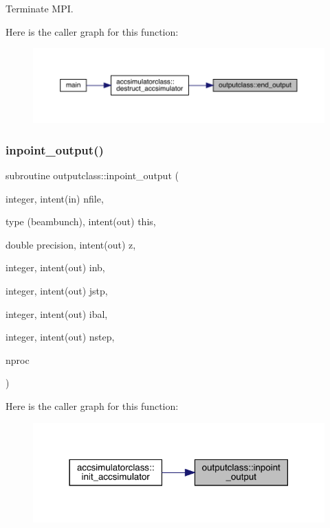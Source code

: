 Terminate M\+PI. 

Here is the caller graph for this function\+:\nopagebreak
\begin{figure}[H]
\begin{center}
\leavevmode
\includegraphics[width=350pt]{namespaceoutputclass_af40e04d104fbdb28b9cae7fb5fcba121_icgraph}
\end{center}
\end{figure}
\mbox{\label{namespaceoutputclass_a4ad23aaddd82d8307416875d28e5c512}} 
\subsubsection{\texorpdfstring{inpoint\_output()}{inpoint\_output()}}
{\footnotesize\ttfamily subroutine outputclass\+::inpoint\+\_\+output (\begin{DoxyParamCaption}\item[{integer, intent(in)}]{nfile,  }\item[{type (beambunch), intent(out)}]{this,  }\item[{double precision, intent(out)}]{z,  }\item[{integer, intent(out)}]{inb,  }\item[{integer, intent(out)}]{jstp,  }\item[{integer, intent(out)}]{ibal,  }\item[{integer, intent(out)}]{nstep,  }\item[{}]{nproc }\end{DoxyParamCaption})}

Here is the caller graph for this function\+:\nopagebreak
\begin{figure}[H]
\begin{center}
\leavevmode
\includegraphics[width=318pt]{namespaceoutputclass_a4ad23aaddd82d8307416875d28e5c512_icgraph}
\end{center}
\end{figure}
\mbox{\label{namespaceoutputclass_a15a58393664c8a9ded7a8e259fc511e8}} 
